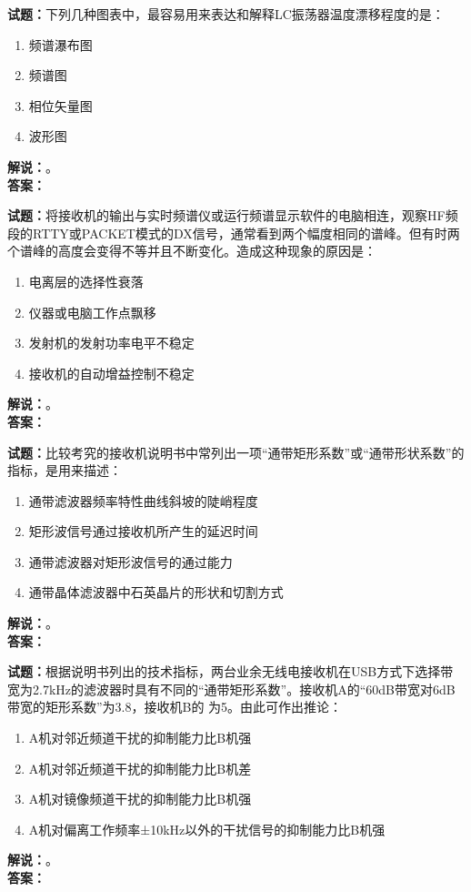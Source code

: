 \documentclass{ctexbook}
\begin{document}
\noindent\textbf{试题：}下列几种图表中，最容易用来表达和解释LC振荡器温度漂移程度的是：
\begin{enumerate}[leftmargin=3em]
  \item 频谱瀑布图
  \item 频谱图
  \item 相位矢量图
  \item 波形图
\end{enumerate}
\noindent\textbf{解说：}\textbf{}。\\\noindent\textbf{答案：}

\bigskip

\noindent\textbf{试题：}将接收机的输出与实时频谱仪或运行频谱显示软件的电脑相连，观察HF频段的RTTY或PACKET模式的DX信号，通常看到两个幅度相同的谱峰。但有时两个谱峰的高度会变得不等并且不断变化。造成这种现象的原因是：
\begin{enumerate}[leftmargin=3em]
  \item 电离层的选择性衰落
  \item 仪器或电脑工作点飘移
  \item 发射机的发射功率电平不稳定
  \item 接收机的自动增益控制不稳定
\end{enumerate}
\noindent\textbf{解说：}\textbf{}。\\\noindent\textbf{答案：}

\bigskip

\noindent\textbf{试题：}比较考究的接收机说明书中常列出一项“通带矩形系数”或“通带形状系数”的指标，是用来描述：
\begin{enumerate}[leftmargin=3em]
  \item 通带滤波器频率特性曲线斜坡的陡峭程度
  \item 矩形波信号通过接收机所产生的延迟时间
  \item 通带滤波器对矩形波信号的通过能力
  \item 通带晶体滤波器中石英晶片的形状和切割方式
\end{enumerate}
\noindent\textbf{解说：}\textbf{}。\\\noindent\textbf{答案：}

\bigskip

\noindent\textbf{试题：}根据说明书列出的技术指标，两台业余无线电接收机在USB方式下选择带宽为2.7\unit{\kHz}的滤波器时具有不同的“通带矩形系数”。接收机A的“60dB带宽对6dB带宽的矩形系数”为3.8，接收机B的 为5。由此可作出推论：
\begin{enumerate}[leftmargin=3em]
  \item A机对邻近频道干扰的抑制能力比B机强
  \item A机对邻近频道干扰的抑制能力比B机差
  \item A机对镜像频道干扰的抑制能力比B机强
  \item A机对偏离工作频率±10\unit{\kHz}以外的干扰信号的抑制能力比B机强
\end{enumerate}
\noindent\textbf{解说：}\textbf{}。\\\noindent\textbf{答案：}
\end{document}
